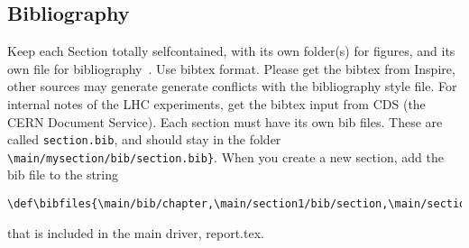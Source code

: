 \subsection{Bibliography}
Keep each Section totally selfcontained, with
its own folder(s) for figures, and its own file for
bibliography~\cite{Mangano:2270978}.
Use bibtex format. Please get the bibtex from Inspire, other sources
may generate generate conflicts with the bibliography style file. For
internal notes of the LHC experiments, get the bibtex input from CDS
(the CERN Document Service). Each section must have its own bib
files. These are called \texttt{section.bib}, and should stay in the
folder
\verb|\main/mysection/bib/section.bib}|.
When you create a new section, add the bib file to the string
\begin{verbatim} 
\def\bibfiles{\main/bib/chapter,\main/section1/bib/section,\main/section2/bib/section}
\end{verbatim}
that is included in the main driver, report.tex.





